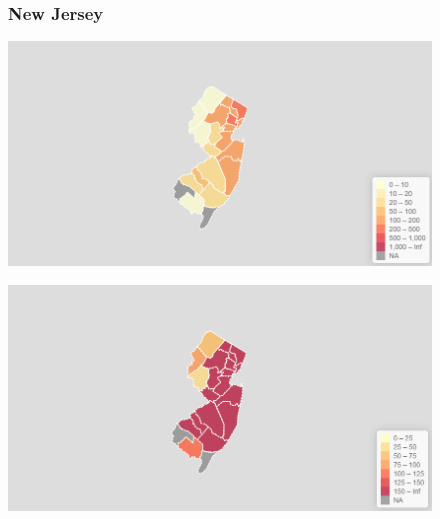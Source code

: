\documentclass[11pt]{article}
\begin{document}
\begin{landscape}
\begin{figure}[h]
\subsubsection*{New Jersey}
\vfill
\hspace*{-3cm}
\begin{minipage}{.8\textwidth}
    \includegraphics[width=.95\textwidth]{ImageResults/NewJerseyTotal.PNG}
\end{minipage}%
\begin{minipage}{.8\textwidth}
    \includegraphics[width=.95\textwidth]{ImageResults/NewJersey100k.PNG}
    \label{fig:Newj100k}
\end{minipage}
\fillandplacepagenumber
\end{figure}
\end{landscape}
\end{document}
